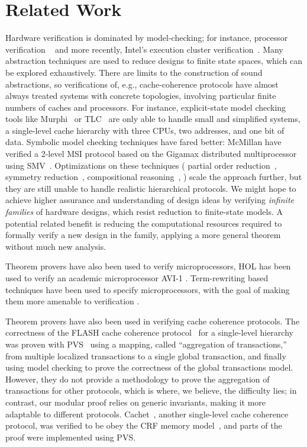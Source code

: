 ﻿\section{Related Work}
\label{relatedWork}

Hardware verification is dominated by model-checking; for instance, processor
verification ~\cite{burch1994automatic, mcmillan1998verification} and more
recently, Intel's execution cluster verification~\cite{kaivola2009replacing}.
Many abstraction techniques are used to reduce designs to finite state spaces,
which can be explored exhaustively. There are limits to the construction of
sound abstractions, so verifications of, e.g., cache-coherence protocols have
almost always treated systems with concrete topologies, involving particular
finite numbers of caches and processors. For instance, explicit-state model
checking tools like Murphi~\cite{murphi} or TLC~\cite{tlc} are only able to
handle small and simplified systems, \eg{} a single-level cache hierarchy with
three CPUs, two addresses, and one bit of data. Symbolic model checking
techniques have fared better: McMillan \etal{} have verified a 2-level MSI
protocol based on the Gigamax distributed multiprocessor using
SMV~\cite{gigamax}. Optimizations on these techniques (\eg{} partial order
reduction~\cite{part}, symmetry reduction~\cite{sym1, sym2}, compositional
reasoning~\cite{comp, Mccomp, mcc}, \etc{}) scale the approach further, but
they are still unable to handle realistic hierarchical protocols. We might hope
to achieve higher assurance and understanding of design ideas by verifying
\emph{infinite families} of hardware designs, which resist reduction to
finite-state models.  A potential related benefit is reducing the computational
resources required to formally verify a new design in the family, applying a
more general theorem without much new analysis.

Theorem provers have also been used to verify microprocessors, \eg{} HOL has
been used to verify an academic microprocessor AVI-1 \cite{windley1995formal}.
Term-rewriting based techniques have been used to specify microprocessors, with
the goal of making them more amenable to verification \cite{shen1999using}.

Theorem provers have also been used in verifying cache coherence protocols. The
correctness of the FLASH cache coherence protocol~\cite{flash} for a
single-level hierarchy was proven with PVS~\cite{park} using a mapping, called
``aggregation of transactions,'' from multiple localized transactions to a
single global transaction, and finally using model checking to prove the
correctness of the global transactions model. However, they do not provide a
methodology to prove the aggregation of transactions for other protocols, which
is where, we believe, the difficulty lies; in contrast, our modular proof
relies on generic invariants, making it more adaptable to different protocols.
Cachet~\cite{StoyShenArvind:Proofs}, another single-level cache coherence
protocol, was verified to be obey the CRF memory model~\cite{Shen:CRF}, and
parts of the proof were implemented using PVS.


